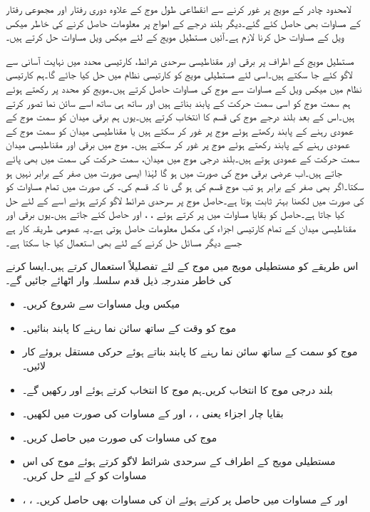 لامحدود چادر کے مویج پر غور کرنے سے انقطاعی طول موج کے علاوہ دوری رفتار اور مجموعی رفتار کے مساوات بھی حاصل کئے گئے۔دیگر بلند درجے کے امواج پر معلومات حاصل کرنے کی خاطر میکس ویل کے مساوات حل کرنا لازم ہے۔آئیں  مستطیل مویج کے لئے میکس ویل مساوات حل کرتے ہیں۔

مستطیل مویج کے اطراف پر برقی اور مقناطیسی سرحدی شرائط، کارتیسی محدد میں نہایت آسانی سے لاگو کئے جا سکتے ہیں۔اسی لئے مستطیلی مویج کو کارتیسی نظام میں حل کیا جائے گا۔ہم کارتیسی نظام میں میکس ویل کے مساوات سے  موج کی مساوات حاصل کرتے ہیں۔مویج کو  محدد پر رکھتے ہوئے ہم سمت موج کو اسی سمت حرکت کے پابند بناتے ہیں اور ساتھ ہی ساتھ اسے سائن نما تصور کرتے ہیں۔اس کے بعد بلند درجے موج کی قسم کا انتخاب کرتے ہیں۔یوں ہم برقی میدان  کو سمت موج کے عمودی رہنے کے پابند رکھتے ہوئے   موج پر غور کر سکتے ہیں یا مقناطیسی میدان کو سمت موج کے عمودی رہنے کے پابند رکھتے ہوئے   موج پر غور کر سکتے ہیں۔ موج میں برقی اور مقناطیسی میدان سمت حرکت کے عمودی ہوتے ہیں۔بلند درجی موج میں میدان، سمت حرکت کی سمت میں بھی پائے جاتے ہیں۔اب عرضی برقی  موج کی صورت میں  ہو گا لہٰذا ایسی صورت میں  صفر کے برابر نہیں ہو سکتا۔اگر  بھی صفر کے برابر ہو تب موج  قسم کی ہو گی نا کہ  قسم کی۔ کی صورت میں تمام مساوات کو  کی صورت میں لکھنا بہتر ثابت ہوتا ہے۔حاصل موج پر سرحدی شرائط لاگو کرتے ہوئے اسے  کے لئے حل کیا جاتا ہے۔حاصل  کو بقایا مساوات میں پر کرتے ہوئے ، ،  اور  حاصل کئے جاتے ہیں۔یوں برقی اور مقناطیسی میدان کے تمام کارتیسی اجزاء کی مکمل معلومات حاصل ہوتی ہے۔یہ عمومی طریقہ کار ہے جسے دیگر مسائل حل کرنے کے لئے بھی استعمال کیا جا سکتا ہے۔

اس طریقے کو مستطیلی مویج میں  موج کے لئے تفصلیلاً  استعمال کرتے ہیں۔ایسا کرنے کی خاطر مندرجہ ذیل قدم سلسلہ وار اٹھائے جائیں گے۔
\begin{itemize}\label{اقدام_مویج_آٹھ_قدم}
\item
میکس ویل مساوات سے شروع کریں۔
\item
موج کو وقت کے ساتھ سائن نما رہنے کا پابند بنائیں۔
\item
موج کو  سمت کے ساتھ سائن نما رہنے کا پابند بناتے ہوئے  حرکی مستقل بروئے کار لائیں۔
\item
بلند درجی موج کا انتخاب کریں۔ہم  موج کا انتخاب کرتے ہوئے  اور  رکھیں گے۔
\item
بقایا چار اجزاء یعنی ، ،  اور  کے مساوات  کی صورت میں لکھیں۔
\item
موج کی مساوات  کی صورت میں حاصل کریں۔
\item
مستطیلی مویج کے اطراف کے سرحدی شرائط لاگو کرتے ہوئے موج کی اس مساوات کو  کے لئے حل کریں۔
\item
{}، ،  اور  کے مساوات میں حاصل  پر کرتے ہوئے ان کی مساوات بھی حاصل کریں۔
\end{itemize}  

